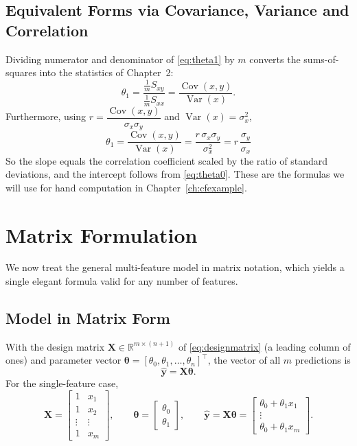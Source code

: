 \documentclass[11pt,a4paper]{report}
\theoremstyle{definition}
\theoremstyle{plain}
\theoremstyle{remark}
\newcommand{\R}{\mathbb{R}}
\newcommand{\vy}{\mathbf{y}}
\newcommand{\vw}{\bm{\theta}}          %
\newcommand{\Xmat}{\mathbf{X}}
\DeclareMathOperator{\Cov}{Cov}
\DeclareMathOperator{\Var}{Var}
\begin{document}
	\section{Equivalent Forms via Covariance, Variance and Correlation}
	Dividing numerator and denominator of \eqref{eq:theta1} by $m$ converts the
	sums-of-squares into the statistics of Chapter~2:
	\begin{equation}
		\theta_1=\frac{\frac1m S_{xy}}{\frac1m S_{xx}}
		=\frac{\Cov(x,y)}{\Var(x)} .
		\label{eq:theta1cov}
	\end{equation}
	Furthermore, using $r=\dfrac{\Cov(x,y)}{\sigma_x\sigma_y}$ and
	$\Var(x)=\sigma_x^2$,
	\begin{equation}
		\boxed{\;\theta_1=\frac{\Cov(x,y)}{\Var(x)}
			=\frac{r\,\sigma_x\sigma_y}{\sigma_x^2}
			=r\,\frac{\sigma_y}{\sigma_x}\;}
		\label{eq:theta1r}
	\end{equation}
	So the slope equals the correlation coefficient scaled by the ratio of standard
	deviations, and the intercept follows from \eqref{eq:theta0}. These are the
	formulas we will use for hand computation in Chapter~\ref{ch:cfexample}.
	
	\chapter{Matrix Formulation}
	
	We now treat the general multi-feature model in matrix notation, which yields a
	single elegant formula valid for any number of features.
	
	\section{Model in Matrix Form}
	With the design matrix $\Xmat\in\R^{m\times(n+1)}$ of \eqref{eq:designmatrix}
	(a leading column of ones) and parameter vector
	$\vw=[\theta_0,\theta_1,\dots,\theta_n]^{\!\top}$, the vector of all $m$
	predictions is
	\begin{equation}
		\hat{\vy}=\Xmat\vw .
		\label{eq:matpred}
	\end{equation}
	For the single-feature case,
	\[
	\Xmat=\begin{bmatrix}1&x_1\\1&x_2\\\vdots&\vdots\\1&x_m\end{bmatrix},\qquad
	\vw=\begin{bmatrix}\theta_0\\\theta_1\end{bmatrix},\qquad
	\hat{\vy}=\Xmat\vw=\begin{bmatrix}\theta_0+\theta_1 x_1\\\vdots\\\theta_0+\theta_1 x_m\end{bmatrix}.
	\]
	
\end{document}
